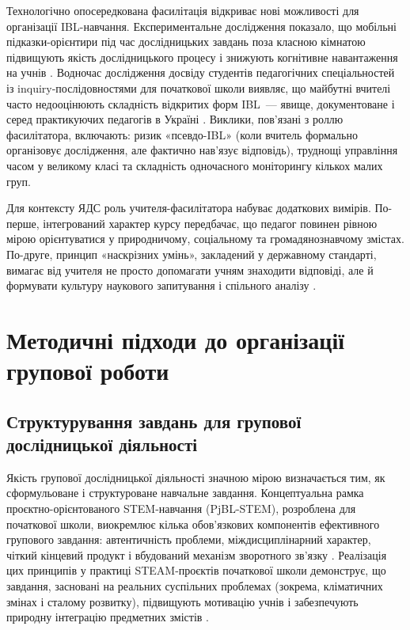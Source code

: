 \documentclass[a4paper,14pt]{extarticle}
\begin{document}
Технологічно опосередкована фасилітація відкриває нові можливості для організації IBL-навчання. Експериментальне дослідження показало, що мобільні підказки-орієнтири під час дослідницьких завдань поза класною кімнатою підвищують якість дослідницького процесу і знижують когнітивне навантаження на учнів \parencite{Martin20245}. Водночас дослідження досвіду студентів педагогічних спеціальностей із inquiry-послідовностями для початкової школи виявляє, що майбутні вчителі часто недооцінюють складність відкритих форм IBL~--- явище, документоване і серед практикуючих педагогів в Україні \parencite{Haslekås2022}. Виклики, пов'язані з роллю фасилітатора, включають: ризик «псевдо-IBL» (коли вчитель формально організовує дослідження, але фактично нав'язує відповідь), труднощі управління часом у великому класі та складність одночасного моніторингу кількох малих груп.

Для контексту ЯДС роль учителя-фасилітатора набуває додаткових вимірів. По-перше, інтегрований характер курсу передбачає, що педагог повинен рівною мірою орієнтуватися у природничому, соціальному та громадянознавчому змістах. По-друге, принцип «наскрізних умінь», закладений у державному стандарті, вимагає від учителя не просто допомагати учням знаходити відповіді, але й формувати культуру наукового запитування і спільного аналізу \parencite{Bibik2017}.

\newpage

\section{Методичні підходи до організації групової роботи}

\subsection{Структурування завдань для групової дослідницької діяльності}

Якість групової дослідницької діяльності значною мірою визначається тим, як сформульоване і структуроване навчальне завдання. Концептуальна рамка проєктно-орієнтованого STEM-навчання (PjBL-STEM), розроблена для початкової школи, виокремлює кілька обов'язкових компонентів ефективного групового завдання: автентичність проблеми, міждисциплінарний характер, чіткий кінцевий продукт і вбудований механізм зворотного зв'язку \parencite{Retno2025579}. Реалізація цих принципів у практиці STEAM-проєктів початкової школи демонструє, що завдання, засновані на реальних суспільних проблемах (зокрема, кліматичних змінах і сталому розвитку), підвищують мотивацію учнів і забезпечують природну інтеграцію предметних змістів \parencite{Vicente20201}.
\end{document}
